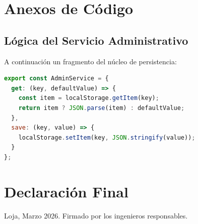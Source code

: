 \documentclass[12pt,a4paper,oneside]{report}
\begin{document}
\appendix
\chapter{Anexos de Código}

\section{Lógica del Servicio Administrativo}
A continuación un fragmento del núcleo de persistencia:

\begin{lstlisting}[language=JavaScript]
export const AdminService = {
  get: (key, defaultValue) => {
    const item = localStorage.getItem(key);
    return item ? JSON.parse(item) : defaultValue;
  },
  save: (key, value) => {
    localStorage.setItem(key, JSON.stringify(value));
  }
};
\end{lstlisting}

\chapter*{Declaración Final}
Loja, Marzo 2026. Firmado por los ingenieros responsables.
\end{document}

